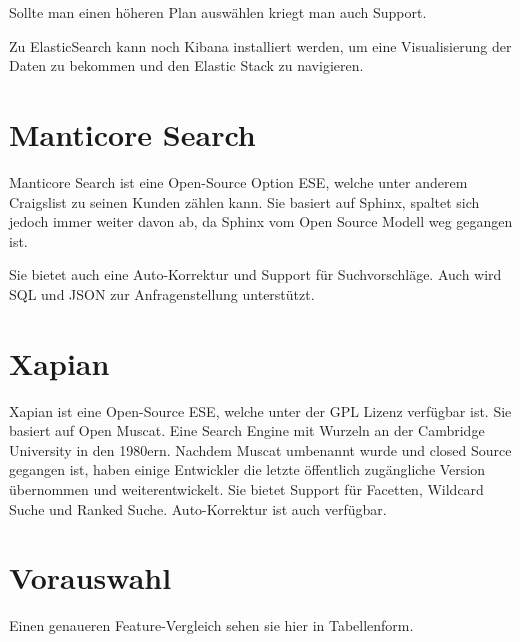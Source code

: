 Sollte man einen höheren Plan auswählen kriegt man auch Support.

Zu ElasticSearch kann noch Kibana installiert werden, um eine Visualisierung der Daten zu bekommen und den Elastic Stack zu navigieren.

\cite{Elasticsearch.2019}

\section{Manticore Search}

Manticore Search ist eine Open-Source Option ESE, welche unter anderem Craigslist zu seinen Kunden zählen kann. Sie basiert auf Sphinx, spaltet sich jedoch immer weiter davon ab, da Sphinx vom Open Source Modell weg gegangen ist.

Sie bietet auch eine Auto-Korrektur und Support für Suchvorschläge. Auch wird SQL und JSON zur Anfragenstellung unterstützt.

\cite{ManticoreSoftwareLtd.2019}


\section{Xapian}

Xapian ist eine Open-Source ESE, welche unter der GPL Lizenz verfügbar ist. Sie basiert auf Open Muscat. Eine Search Engine mit Wurzeln an der Cambridge University in den 1980ern. Nachdem Muscat umbenannt wurde und closed Source gegangen ist, haben einige Entwickler die letzte öffentlich zugängliche Version übernommen und weiterentwickelt.
Sie bietet Support für Facetten, Wildcard Suche und Ranked Suche. Auto-Korrektur ist auch verfügbar.

\section {Vorauswahl}

Einen genaueren Feature-Vergleich sehen sie hier in Tabellenform.


